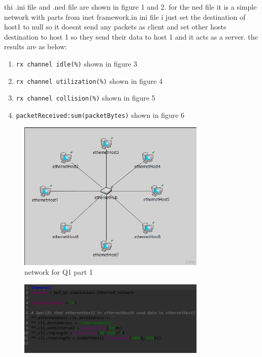 \begin{qsolve}
    \begin{qsolve}[]
        thi .ini file and .ned file are shown in figure 1 and 2. for the ned file it is a simple network with parts from inet framework.in ini file i just set the destination of host1 to null so it doesnt send any packets as client and set other hosts destination to host 1 so they send their data to host 1 and it acts as a server. the results are as below:
        \begin{enumerate}
            \item \texttt{rx channel idle(\%)} shown in figure 3
            \item \texttt{rx channel utilization(\%)} shown in figure 4
            \item \texttt{rx channel collision(\%)} shown in figure 5
            \item \texttt{packetReceived:sum(packetBytes)} shown in figure 6
        \end{enumerate}
        \splitqsolve[\splitqsolve]
        \begin{figure}[H]
            \centering
            \includegraphics[width=0.8\textwidth]{Q1_1ned.png}
            \caption{network for Q1 part 1}
        \end{figure}
        \begin{figure}[H]
            \centering
            \includegraphics[width=0.8\textwidth]{Q1_1ini.png}

\end{figure}
\end{qsolve}
\end{qsolve}
